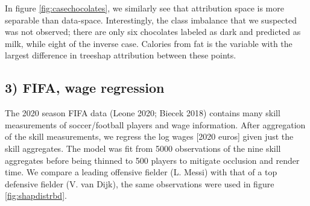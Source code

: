 \documentclass[
  article]{article}
\begin{document}
In figure \ref{fig:casechocolates}, we similarly see that attribution space is more separable than data-space. Interestingly, the class imbalance that we suspected was not observed; there are only six chocolates labeled as dark and predicted as milk, while eight of the inverse case. Calories from fat is the variable with the largest difference in treeshap attribution between these points.

\hypertarget{fifa-wage-regression}{%
\subsection{3) FIFA, wage regression}\label{fifa-wage-regression}}

The 2020 season FIFA data (Leone 2020; Biecek 2018) contains many skill measurements of soccer/football players and wage information. After aggregation of the skill measurements, we regress the log wages {[}2020 euros{]} given just the skill aggregates. The model was fit from 5000 observations of the nine skill aggregates before being thinned to 500 players to mitigate occlusion and render time. We compare a leading offensive fielder (L. Messi) with that of a top defensive fielder (V. van Dijk), the same observations were used in figure \ref{fig:shapdistrbd}.
\end{document}
